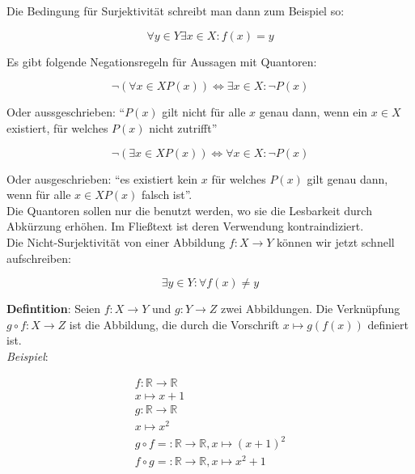 \documentclass{article}
\begin{document}
\vspace{3mm} \\
\vspace{3mm} \\
Die Bedingung für Surjektivität schreibt man dann zum Beispiel so:

\[
  \forall y \in Y \exists x \in X \colon f(x) = y
\]

Es gibt folgende Negationsregeln für Aussagen mit Quantoren:

\[
  \neg (\forall x \in X P(x)) \iff \exists x \in X \colon \neg P(x)
\]

Oder aussgeschrieben: ``$P(x)$ gilt nicht für alle $x$ genau dann, wenn ein $x \in X$ existiert, für welches
$P(x)$ nicht zutrifft''

\[
  \neg (\exists x \in X P(x)) \iff \forall x \in X \colon \neg P(x)
\]

Oder ausgeschrieben: ``es existiert kein $x$ für welches $P(x)$ gilt genau dann, wenn für alle $x \in X P(x)$
falsch ist''. \\

Die Quantoren sollen nur die benutzt werden, wo sie die Lesbarkeit durch Abkürzung erhöhen.
Im Fließtext ist deren Verwendung kontraindiziert. \\

Die Nicht-Surjektivität von einer Abbildung $f \colon X \to Y$ können wir jetzt schnell aufschreiben:

\[
  \exists y \in Y \colon \forall f(x) \ne y
\]

\textbf{Defintition}: Seien $f \colon X \to Y$ und $g \colon Y \to Z$ zwei Abbildungen. Die Verknüpfung
$g \circ f \colon X \to Z$ ist die Abbildung, die durch die Vorschrift $x \mapsto g(f(x))$ definiert ist. \\

\emph{Beispiel}:

\begin{align*}
  f \colon \mathbb{R} \to \mathbb{R} \\
  x \mapsto x + 1 \\
  g \colon \mathbb{R} \to \mathbb{R} \\
  x \mapsto x^2 \\
  g \circ f = \colon \mathbb{R} \to \mathbb{R}, x \mapsto (x + 1)^2 \\
  f \circ g = \colon \mathbb{R} \to \mathbb{R}, x \mapsto x^2 + 1 \\
\end{align*}
\end{document}
